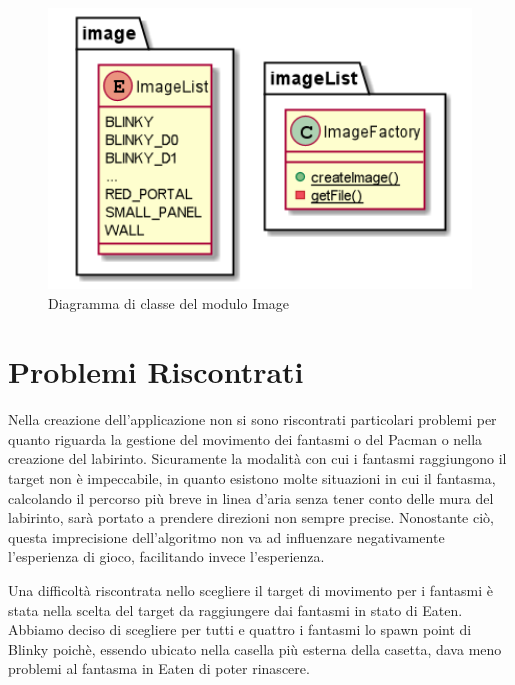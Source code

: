 \documentclass[12pt,a4paper]{report}
\begin{document}
\begin{figure}[tb]
\begin{center}
  \includegraphics[width=15cm]{image}
\end{center}
  \caption{Diagramma di classe del modulo Image}
  \label{fig:image}
\end{figure}





\section{Problemi Riscontrati}\label{ch:proris}
Nella creazione dell’applicazione non si sono riscontrati particolari problemi per quanto riguarda la gestione del movimento dei fantasmi o del Pacman o nella creazione del labirinto. 
Sicuramente la modalità con cui i fantasmi raggiungono il target non è impeccabile, in quanto esistono molte situazioni in cui il fantasma, calcolando il percorso più breve in linea d’aria senza tener conto delle mura del labirinto, sarà portato a prendere direzioni non sempre precise. Nonostante ciò, questa imprecisione dell’algoritmo non va ad influenzare negativamente l’esperienza di gioco, facilitando invece l’esperienza.

Una difficoltà riscontrata nello scegliere il target di movimento per i fantasmi è stata nella scelta del target da raggiungere dai fantasmi in stato di Eaten. Abbiamo deciso di scegliere per tutti e quattro i fantasmi lo spawn point di Blinky poichè, essendo ubicato nella casella più esterna della casetta, dava meno problemi al fantasma in Eaten di poter rinascere.
\end{document}
